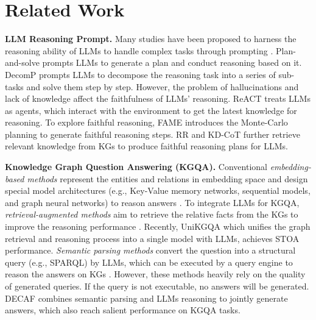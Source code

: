 \section{Related Work}


\vspace{-2mm}
\noindent\textbf{LLM Reasoning Prompt.}
Many studies have been proposed to harness the reasoning ability of LLMs to handle complex tasks through prompting \citep{wei2022chain,wang2022self,yao2023tree,besta2023graph}. Plan-and-solve \citep{wang2023plan} prompts LLMs to generate a plan and conduct reasoning based on it. DecomP \citep{he2021improving} prompts LLMs to decompose the reasoning task into a series of sub-tasks and solve them step by step.
However, the problem of hallucinations and lack of knowledge affect the faithfulness of LLMs' reasoning. ReACT \citep{yao2022react} treats LLMs as agents, which interact with the environment to get the latest knowledge for reasoning. To explore faithful reasoning, FAME \citep{hong2023faithful} introduces the Monte-Carlo planning to generate faithful reasoning steps. RR \citep{he2022rethinking} and KD-CoT \cite{wang2023knowledge} further retrieve relevant knowledge from KGs to produce faithful reasoning plans for LLMs. 

\noindent\textbf{Knowledge Graph Question Answering (KGQA).}
Conventional \emph{embedding-based methods} represent the entities and relations in embedding space and design special model architectures (e.g., Key-Value memory networks, sequential models, and graph neural networks) to reason answers \citep{miller2016key,he2021improving,yasunaga2021qa}. To integrate LLMs for KGQA, \emph{retrieval-augmented methods} aim to retrieve the relative facts from the KGs to improve the reasoning performance \citep{li2023graph,karpukhin2020dense}. Recently, UniKGQA \citep{jiang2022unikgqa} which unifies the graph retrieval and reasoning process into a single model with LLMs, achieves STOA performance. \emph{Semantic parsing methods} convert the question into a structural query (e.g., SPARQL) by LLMs, which can be executed by a query engine to reason the answers on KGs \citep{sun2020sparqa,lan2020query}. However, these methods heavily rely on the quality of generated queries. If the query is not executable, no answers will be generated. DECAF \citep{yu2022decaf} combines semantic parsing and LLMs reasoning to jointly generate answers, which also reach salient performance on KGQA tasks.
